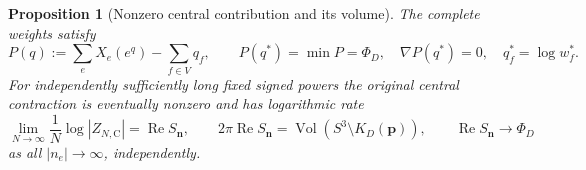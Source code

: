 \documentclass[11pt]{article}
\numberwithin{equation}{section}
\newtheorem{proposition}[theorem]{Proposition}
\theoremstyle{definition}\newtheorem{definition}[theorem]{Definition}
\theoremstyle{remark}\newtheorem{remark}[theorem]{Remark}
\newcommand{\Vol}{\operatorname{Vol}}
\newcommand{\Rea}{\operatorname{Re}}
\newcommand{\C}{\mathrm C}
\begin{document}
\begin{proposition}[Nonzero central contribution and its volume]
\label{pc:central-import}
The complete weights satisfy
\begin{equation}\label{pc:complete}
 P(q):=\sum_e X_e(e^q)-\sum_{f\in V}q_f,\qquad
 P(q^*)=\min P=\Phi_D,\quad \nabla P(q^*)=0,
                  \quad q_f^*=\log w_f^* .
\end{equation}
For independently sufficiently long fixed signed powers the original
central contraction is eventually nonzero and has logarithmic rate
\begin{equation}\label{pc:central-rate}
 \lim_{N\to\infty}\frac1N\log|Z_{N,\C}|=\Rea S_{\boldsymbol n},
 \qquad
 2\pi\Rea S_{\boldsymbol n}
   =\Vol(S^3\setminus K_D(\boldsymbol p)),
 \qquad
 \Rea S_{\boldsymbol n}\longrightarrow\Phi_D
\end{equation}
as all \(|n_e|\to\infty\), independently.
\end{proposition}
\end{document}
